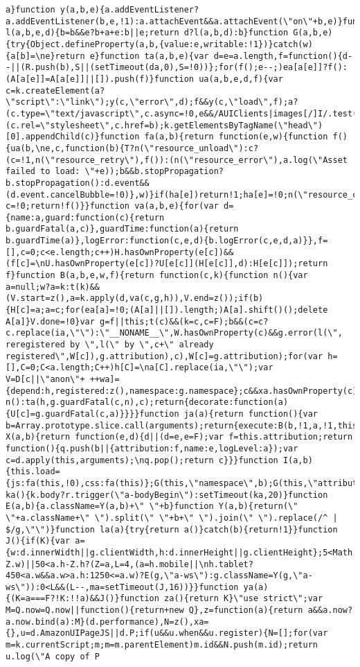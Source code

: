 \documentclass[
]{article}
\begin{document}
\begin{verbatim}
a}function y(a,b,e){a.addEventListener?a.addEventListener(b,e,!1):a.attachEvent&&a.attachEvent(\"on\"+b,e)}function l(a,b,e,d){b=b&&e?b+a+e:b||e;return d?l(a,b,d):b}function G(a,b,e){try{Object.defineProperty(a,b,{value:e,writable:!1})}catch(w){a[b]=\ne}return e}function ta(a,b,e){var d=e=a.length,f=function(){d--||(R.push(b),S||(setTimeout(da,0),S=!0))};for(f();e--;)ea[a[e]]?f():(A[a[e]]=A[a[e]]||[]).push(f)}function ua(a,b,e,d,f){var c=k.createElement(a?\"script\":\"link\");y(c,\"error\",d);f&&y(c,\"load\",f);a?(c.type=\"text/javascript\",c.async=!0,e&&/AUIClients|images[/]I/.test(b)&&c.setAttribute(\"crossorigin\",\"anonymous\"),c.src=b):(c.rel=\"stylesheet\",c.href=b);k.getElementsByTagName(\"head\")[0].appendChild(c)}function fa(a,b){return function(e,w){function f(){ua(b,\ne,c,function(b){T?n(\"resource_unload\"):c?(c=!1,n(\"resource_retry\"),f()):(n(\"resource_error\"),a.log(\"Asset failed to load: \"+e));b&&b.stopPropagation?b.stopPropagation():d.event&&(d.event.cancelBubble=!0)},w)}if(ha[e])return!1;ha[e]=!0;n(\"resource_count\");var c=!0;return!f()}}function va(a,b,e){for(var d={name:a,guard:function(c){return b.guardFatal(a,c)},guardTime:function(a){return b.guardTime(a)},logError:function(c,e,d){b.logError(c,e,d,a)}},f=[],c=0;c<e.length;c++)H.hasOwnProperty(e[c])&&(f[c]=\nU.hasOwnProperty(e[c])?U[e[c]](H[e[c]],d):H[e[c]]);return f}function B(a,b,e,w,f){return function(c,k){function n(){var a=null;w?a=k:t(k)&&(V.start=z(),a=k.apply(d,va(c,g,h)),V.end=z());if(b){H[c]=a;a=c;for(ea[a]=!0;(A[a]||[]).length;)A[a].shift()();delete A[a]}V.done=!0}var g=f||this;t(c)&&(k=c,c=F);b&&(c=c?c.replace(ia,\"\"):\"__NONAME__\",W.hasOwnProperty(c)&&g.error(l(\", reregistered by \",l(\" by \",c+\" already registered\",W[c]),g.attribution),c),W[c]=g.attribution);for(var h=[],C=0;C<a.length;C++)h[C]=\na[C].replace(ia,\"\");var V=D[c||\"anon\"+ ++wa]={depend:h,registered:z(),namespace:g.namespace};c&&xa.hasOwnProperty(c);e?n():ta(h,g.guardFatal(c,n),c);return{decorate:function(a){U[c]=g.guardFatal(c,a)}}}}function ja(a){return function(){var b=Array.prototype.slice.call(arguments);return{execute:B(b,!1,a,!1,this),register:B(b,!0,a,!1,this)}}}function X(a,b){return function(e,d){d||(d=e,e=F);var f=this.attribution;return function(){q.push(b||{attribution:f,name:e,logLevel:a});var c=d.apply(this,arguments);\nq.pop();return c}}}function I(a,b){this.load={js:fa(this,!0),css:fa(this)};G(this,\"namespace\",b);G(this,\"attribution\",a)}function ka(){k.body?r.trigger(\"a-bodyBegin\"):setTimeout(ka,20)}function E(a,b){a.className=Y(a,b)+\" \"+b}function Y(a,b){return(\" \"+a.className+\" \").split(\" \"+b+\" \").join(\" \").replace(/^ | $/g,\"\")}function la(a){try{return a()}catch(b){return!1}}function J(){if(K){var a={w:d.innerWidth||g.clientWidth,h:d.innerHeight||g.clientHeight};5<Math.abs(a.w-Z.w)||50<a.h-Z.h?(Z=a,L=4,(a=h.mobile||\nh.tablet?450<a.w&&a.w>a.h:1250<=a.w)?E(g,\"a-ws\"):g.className=Y(g,\"a-ws\")):0<L&&(L--,ma=setTimeout(J,16))}}function ya(a){(K=a===F?!K:!!a)&&J()}function za(){return K}\"use strict\";var M=Q.now=Q.now||function(){return+new Q},z=function(a){return a&&a.now?a.now.bind(a):M}(d.performance),N=z(),xa={},u=d.AmazonUIPageJS||d.P;if(u&&u.when&&u.register){N=[];for(var m=k.currentScript;m;m=m.parentElement)m.id&&N.push(m.id);return u.log(\"A copy of P 
\end{verbatim}
\end{document}
